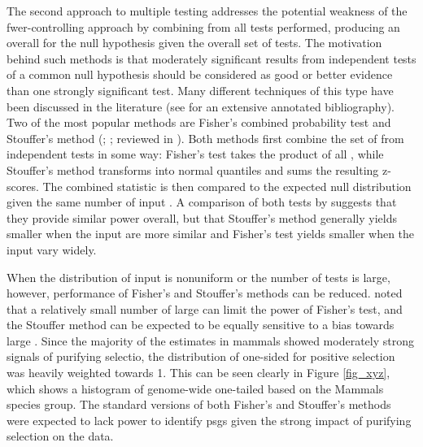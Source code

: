 The second approach to multiple testing addresses the potential
weakness of the \ac{fwer}-controlling approach by combining \pvs from
all \sw tests performed, producing an overall \pv for the null
hypothesis given the overall set of tests. The motivation behind such
methods is that moderately significant results from independent tests
of a common null hypothesis should be considered as good or better
evidence than one strongly significant test. Many different techniques
of this type have been discussed in the literature (see
\citet{Cousins2007} for an extensive annotated bibliography). Two of
the most popular methods are Fisher's combined probability test and
Stouffer's method (\citealp{Fisher1932}; \citealp{Stouffer1949};
reviewed in \citealp{Whitlock2005}). Both methods first combine the
set of \pvs from independent tests in some way: Fisher's test takes
the product of all \pvs, while Stouffer's method transforms
\pvs into normal quantiles and sums the resulting z-scores. The
combined statistic is then compared to the expected null distribution
given the same number of input \pvs. A comparison of both tests by
\citet{Darlington2000} suggests that they provide similar power
overall, but that Stouffer's method generally yields smaller \pvs
when the input \pvs are more similar and Fisher's test yields
smaller \pvs when the input \pvs vary widely.

When the distribution of input \pvs is nonuniform or the number of
tests is large, however, performance of Fisher's and Stouffer's
methods can be reduced. \citet{Zaykin2002} noted that a relatively
small number of large \pvs can limit the power of Fisher's test,
and the Stouffer method can be expected to be equally sensitive to a
bias towards large \pvs. Since the majority of the \sw estimates in
mammals showed moderately strong signals of purifying selectio, the
distribution of one-sided \pvs for positive selection was heavily
weighted towards 1. This can be seen clearly in Figure \ref{fig_xyz},
which shows a histogram of genome-wide one-tailed \pvs based on the
Mammals species group. The standard versions of both Fisher's and
Stouffer's methods were expected to lack power to identify \acp{psg}
given the strong impact of purifying selection on the \sw data.

